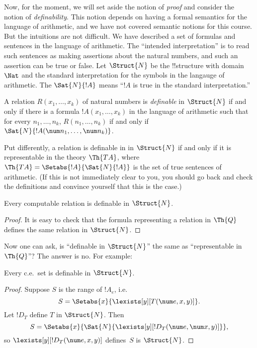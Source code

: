 \documentclass[../../include/open-logic-section]{subfiles}
\begin{document}


Now, for the moment, we will set aside the notion of {\em proof} and
consider the notion of {\em definability}. This notion depends on
having a formal semantics for the language of arithmetic, and we have
not covered semantic notions for this course. But the intuitions are
not difficult. We have described a set of formulas and sentences in
the language of arithmetic. The ``intended interpretation'' is to read
such sentences as making assertions about the natural numbers, and
such an assertion can be true or false. Let $\Struct{N}$ be the
!!{structure} with domain $\Nat$ and the standard interpretation for
the symbols in the langauge of arithmetic.  The $\Sat{N}{!A}$ means
``$!A$ is true in the standard interpretation.''

\begin{defn}
  A relation $R(x_1,\dots,x_k)$ of natural numbers is {\em definable}
  in $\Struct{N}$ if and only if there is a formula $!A(x_1,\dots,x_k)$
  in the language of arithmetic such that for every $n_1,\dots,n_k$,
  $R(n_1,\dots,n_k)$ if and only if $\Sat{N}{!A(\num
  n_1,\dots,\num n_k)}$.
\end{defn}
Put differently, a relation is definable in in $\Struct{N}$ if and
only if it is representable in the theory $\Th{TA}$, where $\Th{TA} =
\Setabs{!A}{\Sat{N}{!A}}$ is the set of true sentences of
arithmetic. (If this is not immediately clear to you, you should go
back and check the definitions and convince yourself that this is the
case.)

\begin{lem}
Every computable relation is definable in $\Struct{N}$.
\end{lem}

\begin{proof}
It is easy to check that the formula representing a relation in
$\Th{Q}$ defines the same relation in $\Struct{N}$. 
\end{proof}

Now one can ask, is ``definable in $\Struct{N}$'' the same as
``representable in $\Th{Q}$''? The answer is no. For example:

\begin{lem}
Every c.e.\ set is definable in $\Struct{N}$.
\end{lem}

\begin{proof}
Suppose $S$ is the range of $!A_e$, i.e.
\[
S = \Setabs{x}{\lexists[y][T(\num e,x,y)]}.
\]
Let $!D_T$ define $T$ in $\Struct{N}$. Then
\[
S = \Setabs{x}{\Sat{N}{\lexists[y][!D_T(\num e, \num x, y)]}},
\]
so $\lexists[y][!D_T(\num e, x, y)]$ defines~$S$ is $\Struct{N}$. 
\end{proof}
\end{document}
